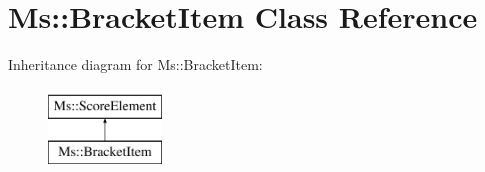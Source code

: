 \hypertarget{class_ms_1_1_bracket_item}{}\section{Ms\+:\+:Bracket\+Item Class Reference}
\label{class_ms_1_1_bracket_item}
Inheritance diagram for Ms\+:\+:Bracket\+Item\+:\begin{figure}[H]
\begin{center}
\leavevmode
\includegraphics[height=2.000000cm]{class_ms_1_1_bracket_item}
\end{center}
\end{figure}
